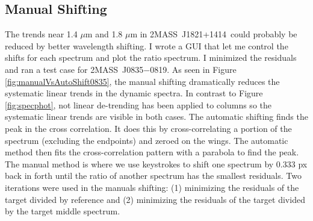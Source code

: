 \documentclass[twocolumn]{aastex6}
\newcommand{\sha}{2MASS~J0835$-$0819}
\newcommand{\shb}{2MASS~J1821+1414}
\begin{document}
\clearpage
\pagebreak
\subsection{Manual Shifting}

The trends near 1.4 $\mu$m and 1.8 $\mu$m in \shb\ could probably be reduced by better wavelength shifting.
I wrote a GUI that let me control the shifts for each spectrum and plot the ratio spectrum.
I minimized the residuals and ran a test case for \sha.
As seen in Figure \ref{fig:manualVsAutoShift0835}, the manual shifting dramatically reduces the systematic linear trends in the dynamic spectra.
In contrast to Figure \ref{fig:specphot}, not linear de-trending has been applied to columns so the systematic linear trends are visible in both cases.
The automatic shifting finds the peak in the cross correlation.
It does this by cross-correlating a portion of the spectrum (excluding the endpoints) and zeroed on the wings. 
The automatic method then fits the cross-correlation pattern with a parabola to find the peak.
The manual method is where we use keystrokes to shift one spectrum by 0.333 px back in forth until the ratio of another spectrum has the smallest residuals.
Two iterations were used in the manuals shifting: (1) minimizing the residuals of the target divided by reference and (2) minimizing the residuals of the target divided by the target middle spectrum.
\end{document}
